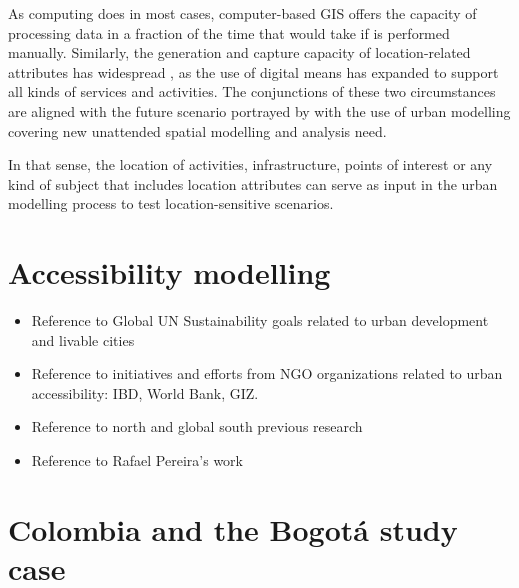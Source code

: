 \documentclass[12pt, a4paper]{report}
\begin{document}





As computing does in most cases, computer-based GIS offers the capacity of processing data in a fraction of the time that would take if is performed manually. Similarly, the generation and capture capacity of location-related attributes has widespread \citep{longleyGeographicInformationScience2015}, as the use of digital means has expanded to support all kinds of services and activities. The conjunctions of these two circumstances are aligned with the future scenario portrayed by \cite{wilsonFutureUrbanModelling2018} with the use of urban modelling covering new unattended spatial modelling and analysis need.



In that sense, the location of activities, infrastructure, points of interest or any kind of subject that includes location attributes can serve as input in the urban modelling process to test location-sensitive scenarios. 



\section{Accessibility modelling}

\begin{itemize}
  \item Reference to Global UN Sustainability goals related to urban development and livable cities
  \item Reference to initiatives and efforts from NGO organizations related to urban accessibility: IBD, World Bank, GIZ.
  \item Reference to north and global south previous research
  \item Reference to Rafael Pereira's work
\end{itemize}

\section{Colombia and the Bogot\'{a} study case}
\end{document}
